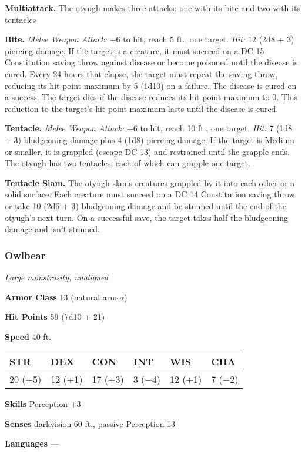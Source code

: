 \documentclass[
]{article}
\begin{document}
\textbf{Multiattack.} The otyugh makes three attacks: one with its bite
and two with its tentacles

\textbf{Bite.} \emph{Melee Weapon Attack:} +6 to hit, reach 5 ft., one
target. \emph{Hit:} 12 (2d8 + 3) piercing damage. If the target is a
creature, it must succeed on a DC 15 Constitution saving throw against
disease or become poisoned until the disease is cured. Every 24 hours
that elapse, the target must repeat the saving throw, reducing its hit
point maximum by 5 (1d10) on a failure. The disease is cured on a
success. The target dies if the disease reduces its hit point maximum to
0. This reduction to the target's hit point maximum lasts until the
disease is cured.

\textbf{Tentacle.} \emph{Melee Weapon Attack:} +6 to hit, reach 10 ft.,
one target. \emph{Hit:} 7 (1d8 + 3) bludgeoning damage plus 4 (1d8)
piercing damage. If the target is Medium or smaller, it is grappled
(escape DC 13) and restrained until the grapple ends. The otyugh has two
tentacles, each of which can grapple one target.

\textbf{Tentacle Slam.} The otyugh slams creatures grappled by it into
each other or a solid surface. Each creature must succeed on a DC 14
Constitution saving throw or take 10 (2d6 + 3) bludgeoning damage and be
stunned until the end of the otyugh's next turn. On a successful save,
the target takes half the bludgeoning damage and isn't stunned.

\hypertarget{owlbear}{%
\subsubsection{Owlbear}\label{owlbear}}

\emph{Large monstrosity, unaligned}

\textbf{Armor Class} 13 (natural armor)

\textbf{Hit Points} 59 (7d10 + 21)

\textbf{Speed} 40 ft.

\begin{longtable}[]{@{}llllll@{}}
\toprule
STR & DEX & CON & INT & WIS & CHA\tabularnewline
\midrule
\endhead
20 (+5) & 12 (+1) & 17 (+3) & 3 (−4) & 12 (+1) & 7 (−2)\tabularnewline
\bottomrule
\end{longtable}

\textbf{Skills} Perception +3

\textbf{Senses} darkvision 60 ft., passive Perception 13

\textbf{Languages} ---
\end{document}
